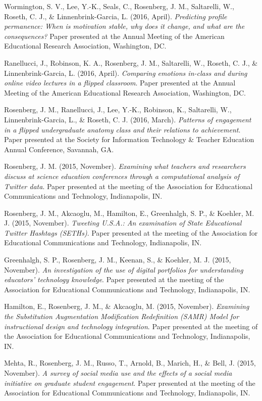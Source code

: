 \documentclass[14,]{article}
\begin{document}
Wormington, S. V., Lee, Y.-K., Seals, C., Rosenberg, J. M., Saltarelli,
W., Roseth, C. J., \& Linnenbrink-Garcia, L. (2016, April).
\emph{Predicting profile permanence: When is motivation stable, why does
it change, and what are the consequences?} Paper presented at the Annual
Meeting of the American Educational Research Association, Washington,
DC.

Ranellucci, J., Robinson, K. A., Rosenberg, J. M., Saltarelli, W.,
Roseth, C. J., \& Linnenbrink-Garcia, L. (2016, April). \emph{Comparing
emotions in-class and during online video lectures in a flipped
classroom}. Paper presented at the Annual Meeting of the American
Educational Research Association, Washington, DC.

Rosenberg, J. M., Ranellucci, J., Lee, Y.-K., Robinson, K., Saltarelli,
W., Linnenbrink-Garcia, L., \& Roseth, C. J. (2016, March).
\emph{Patterns of engagement in a flipped undergraduate anatomy class
and their relations to achievement}. Paper presented at the Society for
Information Technology \& Teacher Education Annual Conference, Savannah,
GA.

Rosenberg, J. M. (2015, November). \emph{Examining what teachers and
researchers discuss at science education conferences through a
computational analysis of Twitter data}. Paper presented at the meeting
of the Association for Educational Communications and Technology,
Indianapolis, IN.

Rosenberg, J. M., Akcaoglu, M., Hamilton, E., Greenhalgh, S. P., \&
Koehler, M. J. (2015, November). \emph{Tweeting U.S.A.: An examination
of State Educational Twitter Hashtags (SETHs)}. Paper presented at the
meeting of the Association for Educational Communications and
Technology, Indianapolis, IN.

Greenhalgh, S. P., Rosenberg, J. M., Keenan, S., \& Koehler, M. J.
(2015, November). \emph{An investigation of the use of digital
portfolios for understanding educators' technology knowledge}. Paper
presented at the meeting of the Association for Educational
Communications and Technology, Indianapolis, IN.

Hamilton, E., Rosenberg, J. M., \& Akcaoglu, M. (2015, November).
\emph{Examining the Substitution Augmentation Modification Redefinition
(SAMR) Model for instructional design and technology integration}. Paper
presented at the meeting of the Association for Educational
Communications and Technology, Indianapolis, IN.

Mehta, R., Rosenberg, J. M., Russo, T., Arnold, B., Marich, H., \& Bell,
J. (2015, November). \emph{A survey of social media use and the effects
of a social media initiative on graduate student engagement}. Paper
presented at the meeting of the Association for Educational
Communications and Technology, Indianapolis, IN.
\end{document}
